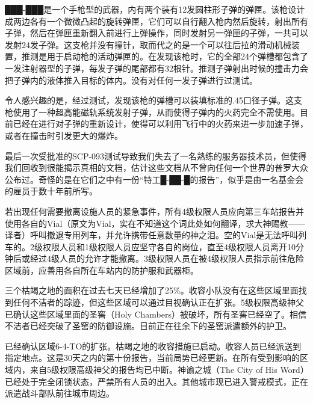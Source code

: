 ███-███是一个手枪型的武器，内有两个装有12发圆柱形子弹的弹匣。该枪设计成两边各有一个微微凸起的旋转弹匣，它们可以自行翻入枪内然后旋转，射出所有子弹，然后在弹匣重新翻入前进行上弹操作，同时发射另一弹匣的子弹，一共可以发射24发子弹。这支枪并没有撞针，取而代之的是一个可以往后拉的滑动机械装置，推测是用于启动枪的活动弹匣的。在发现该枪时，它的全部24个弹槽都包含了一发注射器型的子弹，每发子弹的尾部都有32根针。推测子弹射出时候的撞击力会把子弹内的液体推入目标的体内。没有对任何一发子弹进行过测试。

令人感兴趣的是，经过测试，发现该枪的弹槽可以装填标准的.45口径子弹。这支枪使用了一种超高能磁轨系统发射子弹，从而使得子弹内的火药完全不需使用。目前已经在进行对子弹的重新设计，使得可以利用飞行中的火药来进一步加速子弹，或者在撞击时引发更大的爆炸。

\begin{scpdialog}
\end{scpdialog}

最后一次受批准的SCP-093测试导致我们失去了一名熟练的服务器技术员，但使得我们回收到很能揭示真相的文档，估计这些文档从不曾向任何一个世界的普罗大众公布过。奇怪的是在它们之中有一份“特工█-██-█的报告”，似乎是由一名基金会的雇员于数十年前所写。


\begin{scpbox}

若出现任何需要撤离设施人员的紧急事件，所有4级权限人员应向第三车站报告并使用各自的Vial（原文为Vial，实在不知道这个词此处如何翻译，求大神赐教——译者）呼叫撤退专用列车，并允许携带任意数量的神之泪。空的Vial是无法呼叫列车的。2级权限人员和1级权限人员应坚守各自的岗位，直至4级权限人员离开10分钟后或经过4级人员的允许才能撤离。3级权限人员在被4级权限人员指示前往危险区域前，应善用各自所在车站内的防护服和武器柜。

\end{scpbox}


\begin{scpbox}

三个枯竭之地的面积在过去七天已经增加了25\%。收容小队没有在这些区域里面找到任何不洁者的踪迹，但这些区域可以通过目视确认正在扩张。5级权限高级神父已确认这些区域里面的圣窖（Holy Chambers）被破坏，所有圣窖已经空了。相信不洁者已经突破了圣窖的防御设施。目前正在往余下的圣窖派遣额外的护卫。

\end{scpbox}


\begin{scpbox}

已经确认区域6-4-TO的扩张。枯竭之地的收容措施已启动。收容人员已经派送到指定地点。这是30天之内的第十份报告，当前局势已经更新。在所有受到影响的区域内，来自5级权限高级神父的报告均已中断。神谕之城（The City of His Word）已经处于完全闭锁状态，严禁所有人员的出入。其他城市现已进入警戒模式，正在派遣战斗部队前往城市周边。

\end{scpbox}

